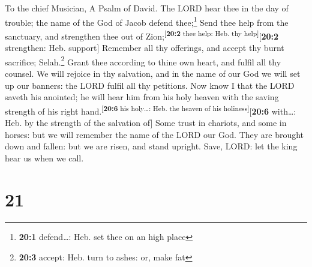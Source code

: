 To the chief Musician, A Psalm of David.  The LORD hear
thee in the day of trouble; the name of the God of Jacob defend
thee;\footnote{\textbf{20:1} defend\ldots: Heb. set thee on an high
  place}  Send thee help from the sanctuary, and
strengthen thee out of Zion;\textsuperscript{{[}\textbf{20:2} thee help:
Heb. thy help{]}}{[}\textbf{20:2} strengthen: Heb. support{]}
 Remember all thy offerings, and accept thy burnt
sacrifice; Selah.\footnote{\textbf{20:3} accept: Heb. turn to ashes: or,
  make fat}  Grant thee according to thine own heart, and
fulfil all thy counsel.  We will rejoice in thy salvation,
and in the name of our God we will set up our banners: the LORD fulfil
all thy petitions.  Now know I that the LORD saveth his
anointed; he will hear him from his holy heaven with the saving strength
of his right hand.\textsuperscript{{[}\textbf{20:6} his holy\ldots: Heb.
the heaven of his holiness{]}}{[}\textbf{20:6} with\ldots: Heb. by the
strength of the salvation of{]}  Some trust in chariots,
and some in horses: but we will remember the name of the LORD our God.
 They are brought down and fallen: but we are risen, and
stand upright.  Save, LORD: let the king hear us when we
call.

\hypertarget{section-20}{%
\section{21}\label{section-20}}

